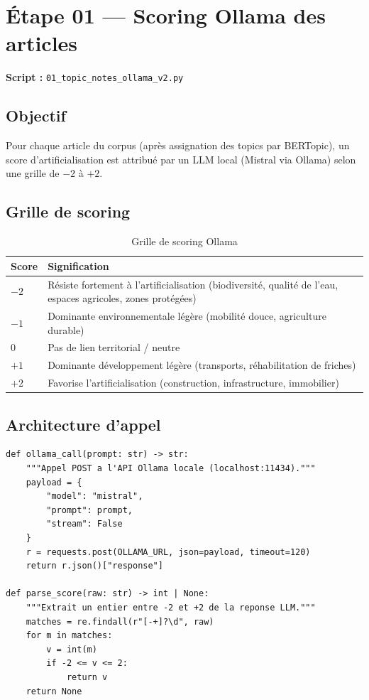 \documentclass[12pt,a4paper]{report}
\newcommand{\code}[1]{\texttt{\small #1}}
\begin{document}
\section{Étape 01 — Scoring Ollama des articles}

\textbf{Script :} \code{01\_topic\_notes\_ollama\_v2.py}

\subsection{Objectif}

Pour chaque article du corpus (après assignation des topics par BERTopic), un score d'artificialisation est attribué par un LLM local (Mistral via Ollama) selon une grille de $-2$ à $+2$.

\subsection{Grille de scoring}

\begin{table}[H]
\centering
\begin{tabular}{>{\centering}p{1.5cm}p{10cm}}
\toprule
\textbf{Score} & \textbf{Signification} \\
\midrule
\rowcolor{scoreQ1!30} $-2$ & Résiste fortement à l'artificialisation (biodiversité, qualité de l'eau, espaces agricoles, zones protégées) \\
\rowcolor{scoreQ2!30} $-1$ & Dominante environnementale légère (mobilité douce, agriculture durable) \\
\rowcolor{scoreQ3!30} $0$  & Pas de lien territorial / neutre \\
\rowcolor{scoreQ4!30} $+1$ & Dominante développement légère (transports, réhabilitation de friches) \\
\rowcolor{scoreQ5!30} $+2$ & Favorise l'artificialisation (construction, infrastructure, immobilier) \\
\bottomrule
\end{tabular}
\caption{Grille de scoring Ollama}
\end{table}

\subsection{Architecture d'appel}

\begin{lstlisting}[language=Python3, caption={Appel Ollama avec parsing robuste du score}]
def ollama_call(prompt: str) -> str:
    """Appel POST a l'API Ollama locale (localhost:11434)."""
    payload = {
        "model": "mistral",
        "prompt": prompt,
        "stream": False
    }
    r = requests.post(OLLAMA_URL, json=payload, timeout=120)
    return r.json()["response"]

def parse_score(raw: str) -> int | None:
    """Extrait un entier entre -2 et +2 de la reponse LLM."""
    matches = re.findall(r"[-+]?\d", raw)
    for m in matches:
        v = int(m)
        if -2 <= v <= 2:
            return v
    return None
\end{lstlisting}
\end{document}
